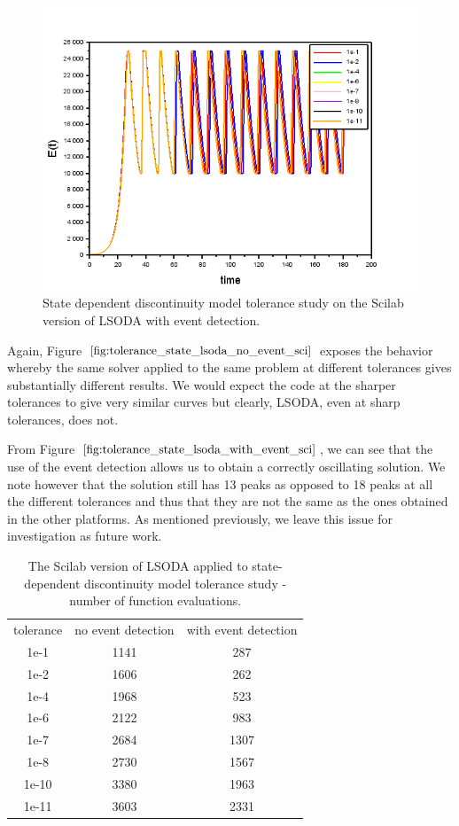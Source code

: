 \begin{figure}[h]
\centering
\includegraphics[width=0.7\linewidth]{./figures/tolerance_state_lsoda_with_event_sci}
\caption{State dependent discontinuity model tolerance study on the Scilab version of LSODA with event detection.}
\label{fig:tolerance_state_lsoda_with_event_sci}
\end{figure}

Again, Figure $\ref{fig:tolerance_state_lsoda_no_event_sci}$ exposes the behavior whereby the same solver applied to the same problem at different tolerances gives substantially different results. We would expect the code at the sharper tolerances to give very similar curves but clearly, LSODA, even at sharp tolerances, does not.

From Figure $\ref{fig:tolerance_state_lsoda_with_event_sci}$, we can see that the use of the event detection allows us to obtain a correctly oscillating solution. We note however that the solution still has 13 peaks as opposed to 18 peaks at all the different tolerances and thus that they are not the same as the ones obtained in the other platforms. As mentioned previously, we leave this issue for investigation as future work.

\begin{table}[h]
\caption {The Scilab version of LSODA applied to state-dependent discontinuity model tolerance study - number of function evaluations.} \label{tab:tolerance_state_discontinuity_lsoda_scilab} 
\begin{center}
\begin{tabular}{ c c c }
tolerance & no event detection & with event detection \\
1e-1 & 1141 & 287 \\
1e-2 & 1606 & 262 \\
1e-4 & 1968 & 523 \\
1e-6 & 2122 & 983 \\
1e-7 & 2684 & 1307 \\
1e-8 & 2730 & 1567 \\
1e-10 & 3380 & 1963 \\
1e-11 & 3603 & 2331 \\
\end{tabular}
\end{center}
\end{table}

